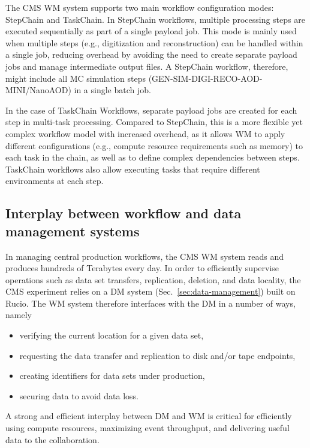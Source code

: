 The CMS \gls{WM} system supports two main workflow configuration modes: StepChain and TaskChain. In StepChain workflows, multiple processing steps are executed sequentially as part of a single payload job. This mode is mainly used when multiple steps (e.g., digitization and reconstruction) can be handled within a single job, reducing overhead by avoiding the need to create separate payload jobs and manage intermediate output files. A StepChain workflow, therefore, might include all \gls{MC} simulation steps (\gls{GEN}-\gls{SIM}-\gls{DIGI}-\gls{RECO}-\gls{AOD}-MINI/NanoAOD) in a single batch job.

In the case of TaskChain Workflows, separate payload jobs are created for each step in multi-task processing. Compared to StepChain, this is a more flexible yet complex workflow model with increased overhead, as it allows \gls{WM} to apply different configurations (e.g., compute resource requirements such as memory) to each task in the chain, as well as to define complex dependencies between steps. TaskChain workflows also allow executing tasks that require different environments at each step.

\subsection{Interplay between workflow and data management systems}

In managing central production workflows, the CMS \gls{WM} system reads and produces hundreds of Terabytes every day. In order to efficiently supervise operations such as data set transfers, replication, deletion, and data locality, the CMS experiment relies on a \gls{DM} system (Sec.~\ref{sec:data-management}) built on Rucio. The \gls{WM} system therefore interfaces with the \gls{DM} in a number of ways, namely
\begin{itemize}
    \item verifying the current location for a given data set,
    \item requesting the data transfer and replication to disk and/or tape endpoints,
    \item creating identifiers for data sets under production,
    \item securing data to avoid data loss.
\end{itemize}

A strong and efficient interplay between \gls{DM} and \gls{WM} is critical for efficiently using compute resources, maximizing event throughput, and delivering useful data to the collaboration. 

